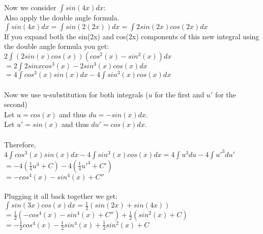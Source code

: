 \documentclass[11pt, oneside]{article}   	%
\begin{document}
\noindent Now we consider $\int sin(4x)dx$:\\
Also apply the double angle formula.\\
$\int sin(4x)dx = \int sin(2(2x))dx = \int 2sin(2x)cos(2x)dx$\\
If you expand both the sin(2x) and cos(2x) components of this new integral using the double angle formula you get:\\
$2 \int (2sin(x)cos(x))(cos^2(x)-sin^2(x)) dx$\\
$= 2 \int 2sinxcos^3(x) - 2 sin^3(x)cos(x) dx$\\
$= 4 \int cos^3(x) sin(x)dx - 4 \int sin^3(x)cos(x)dx$\\~\\
Now we use u-substitution for both integrals ($u$ for the first and $u'$ for the second)\\
Let $u = cos(x)$ and thus $du = -sin(x)dx$. \\
Let $u' = sin(x)$ and thus $du' = cos(x)dx$. \\~\\
Therefore, $4 \int cos^3(x) sin(x)dx - 4 \int sin^3(x)cos(x)dx = 4 \int u^3 du - 4 \int u'^3 du'$\\
$= -4(\frac{1}{4}u^4 + C) -4(\frac{1}{4}u'^4+C')$\\
$= -cos^4(x) - sin^4(x) + C''$\\~\\
Plugging it all back together we get:\\
$\int sin(3x)cos(x)dx = \frac{1}{2}(sin(2x) + sin(4x))$\\
$= \frac{1}{2}(-cos^4(x) - sin^4(x) + C'') + \frac{1}{2}(sin^2(x)+C)$\\
$= -\frac{1}{2}cos^4(x)-\frac{1}{2}sin^4(x) + \frac{1}{2}sin^2(x) + C$
\end{document}
